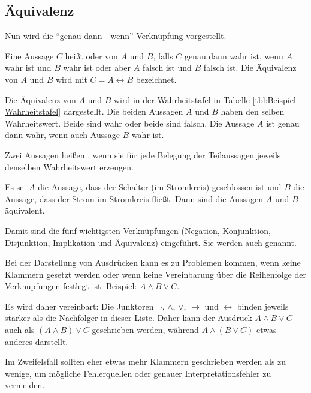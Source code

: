 \subsection*{Äquivalenz}

\begin{Unit} Nun wird die 
\enquote{genau dann - wenn}-Verknüpfung vorgestellt.

\begin{Definition}
Eine Aussage $C$ heißt  oder  von $A$ 
und $B$, falls $C$ genau dann wahr ist, wenn $A$ wahr ist und $B$ wahr ist 
oder aber $A$ falsch ist und $B$ falsch ist. Die Äquivalenz von $A$ und $B$ 
wird mit $C = A \leftrightarrow B$ bezeichnet.
\end{Definition}

Die Äquivalenz von $A$ und $B$ wird in der Wahrheitstafel in Tabelle
\ref{tbl:Beispiel Wahrheitstafel} dargestellt. Die beiden Aussagen $A$ und 
$B$ haben den selben Wahrheitswert. Beide sind wahr oder beide sind falsch. 
Die Aussage $A$ ist genau dann wahr, wenn auch Aussage $B$ wahr ist.

Zwei Aussagen heißen , wenn sie für jede 
Belegung der Teilaussagen jeweils denselben Wahrheitswert erzeugen. 
\end{Unit}

\begin{Unit}[Beispiel]
Es sei $A$ die Aussage, dass der Schalter (im Stromkreis) geschlossen ist und 
$B$ die Aussage, dass der Strom im Stromkreis fließt. Dann sind die Aussagen 
$A$ und $B$ äquivalent.
\end{Unit}

\begin{Unit}[Anmerkung]
Damit sind die fünf wichtigsten Verknüpfungen (Negation, Konjunktion, 
Disjunktion, Implikation und Äquivalenz) eingeführt. Sie werden auch
 genannt.

Bei der Darstellung von Ausdrücken kann es zu Problemen kommen, wenn keine 
Klammern gesetzt werden oder wenn keine Vereinbarung über die Reihenfolge 
der Verknüpfungen festlegt ist. Beispiel: $A \land B \lor C$.

Es wird daher vereinbart: Die Junktoren $\neg$, $\land$, $\lor$, 
$\rightarrow$ und $\leftrightarrow$ binden jeweils stärker als die 
Nachfolger in dieser Liste. Daher kann der Ausdruck $A \land B \lor C$ 
auch als $(A \land B) \lor C$ geschrieben werden, während 
$A \land (B \lor C)$ etwas anderes darstellt.

Im Zweifelsfall sollten eher etwas mehr Klammern geschrieben werden als 
zu wenige, um mögliche Fehlerquellen oder genauer Interpretationsfehler 
zu vermeiden.
\end{Unit}

